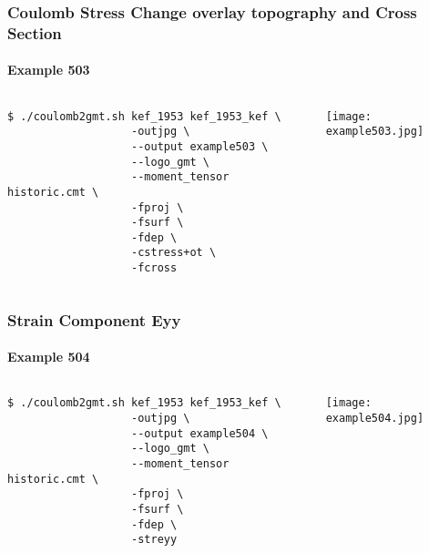 \begin{frame}[t,fragile]
  \frametitle{Coulomb Stress Change overlay topography and Cross Section}
  \framesubtitle{Example 503}
  \label{ch5fr:ex503}
\begin{columns}[t]
  \begin{column}{.5\textwidth}
\begin{scriptsize}
\begin{verbatim}
$ ./coulomb2gmt.sh kef_1953 kef_1953_kef \
                   -outjpg \ 
                   --output example503 \
                   --logo_gmt \
                   --moment_tensor historic.cmt \
                   -fproj \
                   -fsurf \
                   -fdep \
                   -cstress+ot \ 
                   -fcross
\end{verbatim}
\end{scriptsize}

  \end{column}
  \begin{column}{.5\textwidth}

\centering
  \texttt{[image: example503.jpg]}
  \end{column}
\end{columns}

\end{frame}
\note{}

\begin{frame}[t,fragile]
  \frametitle{Strain Component Eyy}
  \framesubtitle{Example 504}
  \label{ch5fr:ex504}
\begin{columns}[t]
  \begin{column}{.5\textwidth}
\begin{scriptsize}
\begin{verbatim}
$ ./coulomb2gmt.sh kef_1953 kef_1953_kef \
                   -outjpg \ 
                   --output example504 \
                   --logo_gmt \
                   --moment_tensor historic.cmt \
                   -fproj \
                   -fsurf \
                   -fdep \
                   -streyy
\end{verbatim}
\end{scriptsize}

  \end{column}
  \begin{column}{.5\textwidth}

\centering
  \texttt{[image: example504.jpg]}
  \end{column}
\end{columns}

\end{frame}
\note{}

